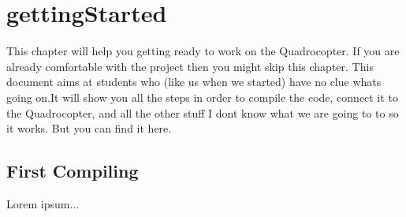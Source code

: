 \chapter{gettingStarted}
\label{gettingStarted}

This chapter will help you getting ready to work on the Quadrocopter. If you are already comfortable with the project then you might skip this chapter. This document aims at students who (like us when we started) have no clue whats going on.It will show you all the steps in order to compile the code, connect it to the Quadrocopter, and all the other stuff I dont know what we are going to to so it works. But you can find it here.\\


\section{First Compiling}

Lorem ipsum...